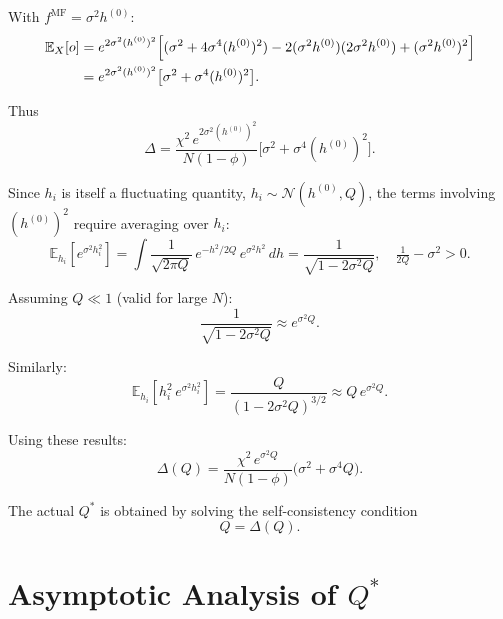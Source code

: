 \documentclass[aps,prb,onecolumn,showpacs,preprintnumbers,amsmath,amssymb]{revtex4-2}
\newcommand{\fMF}{f^{\mathrm{MF}}}
\begin{document}
With $\fMF = \sigma^2 h^{(0)}$:
\begin{align}
    \mathbb{E}_X[o]
    &= e^{2\sigma^2(h^{(0)})^2}\Bigl[(\sigma^2+4\sigma^4(h^{(0)})^2)
       - 2(\sigma^2 h^{(0)})(2\sigma^2 h^{(0)}) + (\sigma^2 h^{(0)})^2\Bigr] \nonumber\\
    &= e^{2\sigma^2(h^{(0)})^2}\bigl[\sigma^2 + \sigma^4(h^{(0)})^2\bigr].
\end{align}

Thus
\begin{equation}
    \Delta = \frac{\chi^2\,e^{2\sigma^2(h^{(0)})^2}}{N(1-\phi)}
                   \bigl[\sigma^2 + \sigma^4(h^{(0)})^2\bigr].
\end{equation}

Since $h_i$ is itself a fluctuating quantity, $h_i \sim \mathcal{N}(h^{(0)}, Q)$,
the terms involving $(h^{(0)})^2$ require averaging over $h_i$:
\begin{equation}
    \mathbb{E}_{h_i}\!\left[e^{\sigma^2 h_i^2}\right]
    = \int \frac{1}{\sqrt{2\pi Q}}\,e^{-h^2/2Q}\,e^{\sigma^2 h^2}\,dh
    = \frac{1}{\sqrt{1-2\sigma^2 Q}},
    \quad \tfrac{1}{2Q}-\sigma^2 > 0.
\end{equation}

Assuming $Q \ll 1$ (valid for large $N$):
\begin{equation}
    \frac{1}{\sqrt{1-2\sigma^2 Q}} \approx e^{\sigma^2 Q}.
\end{equation}

Similarly:
\begin{equation}
    \mathbb{E}_{h_i}\!\left[h_i^2\,e^{\sigma^2 h_i^2}\right]
    = \frac{Q}{(1-2\sigma^2 Q)^{3/2}} \approx Q\,e^{\sigma^2 Q}.
\end{equation}

Using these results:
\begin{equation}
    \Delta(Q) = \frac{\chi^2\,e^{\sigma^2 Q}}{N(1-\phi)}\bigl(\sigma^2 + \sigma^4 Q\bigr).
\end{equation}

The actual $Q^*$ is obtained by solving the self-consistency condition
\begin{equation}
    Q = \Delta(Q).
\end{equation}

\section{Asymptotic Analysis of \texorpdfstring{$Q^*$}{Q*}}
\end{document}
